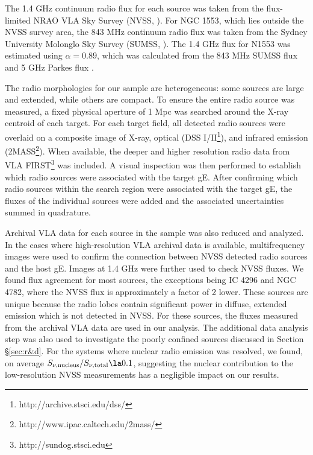 \documentclass{emulateapj}
\begin{document}
The 1.4 GHz continuum radio flux for each source was taken from the
flux-limited NRAO VLA Sky Survey (NVSS, \citealt{nvss}). For NGC 1553,
which lies outside the NVSS survey area, the 843 MHz continuum radio
flux was taken from the Sydney University Molonglo Sky
Survey (SUMSS, \citealt{sumss1, sumss2}). The 1.4 GHz flux for N1553
was estimated using $\alpha = 0.89$, which was calculated from the 843
MHz SUMSS flux and 5 GHz Parkes flux \citep{1970ApL.....5...29W}.

The radio morphologies for our sample are heterogeneous: some sources
are large and extended, while others are compact. To ensure the entire
radio source was measured, a fixed physical aperture of 1 Mpc was
searched around the X-ray centroid of each target. For each target
field, all detected radio sources were overlaid on a composite image
of X-ray, optical (DSS I/II\footnote{http://archive.stsci.edu/dss/}),
and infrared emission
(2MASS\footnote{http://www.ipac.caltech.edu/2mass/}). When available,
the deeper and higher resolution radio data from VLA
FIRST\footnote{http://sundog.stsci.edu} was included. A visual
inspection was then performed to establish which radio sources were
associated with the target gE. After confirming which radio sources
within the search region were associated with the target gE, the
fluxes of the individual sources were added and the associated
uncertainties summed in quadrature.

Archival VLA data for each source in the sample was also reduced and
analyzed. In the cases where high-resolution VLA archival data is
available, multifrequency images were used to confirm the connection
between NVSS detected radio sources and the host gE. Images at 1.4 GHz
were further used to check NVSS fluxes. We found flux agreement for
most sources, the exceptions being IC 4296 and NGC 4782, where the
NVSS flux is approximately a factor of 2 lower. These sources are
unique because the radio lobes contain significant power in diffuse,
extended emission which is not detected in NVSS. For these sources,
the fluxes measured from the archival VLA data are used in our
analysis. The additional data analysis step was also used to
investigate the poorly confined sources discussed in Section
\S\ref{sec:r&d}. For the systems where nuclear radio emission was
resolved, we found, on average $S_{\nu,\mathrm{nucleus}} /
S_{\nu,\mathrm{total}} \la 0.1$, suggesting the nuclear contribution
to the low-resolution NVSS measurements has a negligible impact on our
results.
\end{document}
